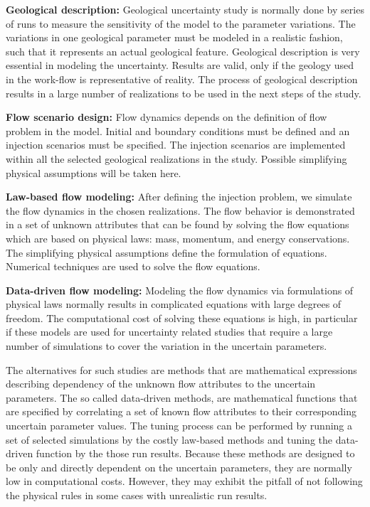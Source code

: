 \textbf{Geological description:} Geological uncertainty study is normally done by series of runs to measure the sensitivity of the model to the parameter variations. The variations in one geological parameter must be modeled in a realistic fashion, such that it represents an actual geological feature. Geological description is very essential in modeling the uncertainty. Results are valid, only if the geology used in the work-flow is representative of reality. The process of geological description results in a large number of realizations to be used in the next steps of the study.

\textbf{Flow scenario design:} Flow dynamics depends on the definition of flow problem in the model. Initial and boundary conditions must be defined and an injection scenarios must be specified. The injection scenarios are implemented within all the selected geological realizations in the study. Possible simplifying physical assumptions will be taken here.

\textbf{Law-based flow modeling:} After defining the injection problem, we simulate the flow dynamics in the chosen realizations. The flow behavior is demonstrated in a set of unknown attributes that can be found by solving the flow equations which are based on physical laws: mass, momentum, and energy conservations. The simplifying physical assumptions define the formulation of equations. Numerical techniques are used to solve the flow equations.

\textbf{Data-driven flow modeling:} Modeling the flow dynamics via formulations of physical laws normally results in complicated equations with large degrees of freedom. The computational cost of solving these equations is high, in particular if these models are used for uncertainty related studies that require a large number of simulations to cover the variation in the uncertain parameters. 

The alternatives for such studies are methods that are mathematical expressions describing dependency of the unknown flow attributes to the uncertain parameters. The so called data-driven methods, are mathematical functions that are specified by correlating a set of known flow attributes to their corresponding uncertain parameter values. The tuning process can be performed by running a set of selected simulations by the costly law-based methods and tuning the data-driven function by the those run results. Because these methods are designed to be only and directly dependent on the uncertain parameters, they are normally low in computational costs. However, they may exhibit the pitfall of not following the physical rules in some cases with unrealistic run results. 


